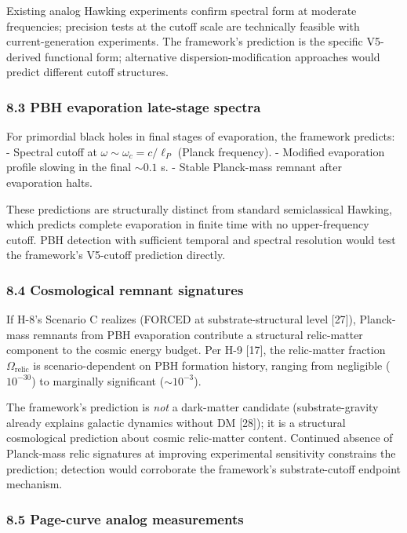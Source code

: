 \documentclass[
  11pt,
  a4paperpaper,
]{article}
\begin{document}
Existing analog Hawking experiments confirm spectral form at moderate
frequencies; precision tests at the cutoff scale are technically
feasible with current-generation experiments. The framework's prediction
is the specific V5-derived functional form; alternative
dispersion-modification approaches would predict different cutoff
structures.

\subsubsection{8.3 PBH evaporation late-stage
spectra}\label{pbh-evaporation-late-stage-spectra}

For primordial black holes in final stages of evaporation, the framework
predicts: - Spectral cutoff at \(\omega \sim \omega_c = c/\ell_P\)
(Planck frequency). - Modified evaporation profile slowing in the final
\(\sim 0.1\) s. - Stable Planck-mass remnant after evaporation halts.

These predictions are structurally distinct from standard semiclassical
Hawking, which predicts complete evaporation in finite time with no
upper-frequency cutoff. PBH detection with sufficient temporal and
spectral resolution would test the framework's V5-cutoff prediction
directly.

\subsubsection{8.4 Cosmological remnant
signatures}\label{cosmological-remnant-signatures}

If H-8's Scenario C realizes (FORCED at substrate-structural level
{[}27{]}), Planck-mass remnants from PBH evaporation contribute a
structural relic-matter component to the cosmic energy budget. Per H-9
{[}17{]}, the relic-matter fraction \(\Omega_{\mathrm{relic}}\) is
scenario-dependent on PBH formation history, ranging from negligible
(\(10^{-30}\)) to marginally significant (\(\sim 10^{-3}\)).

The framework's prediction is \emph{not} a dark-matter candidate
(substrate-gravity already explains galactic dynamics without DM
{[}28{]}); it is a structural cosmological prediction about cosmic
relic-matter content. Continued absence of Planck-mass relic signatures
at improving experimental sensitivity constrains the prediction;
detection would corroborate the framework's substrate-cutoff endpoint
mechanism.

\subsubsection{8.5 Page-curve analog
measurements}\label{page-curve-analog-measurements}
\end{document}

